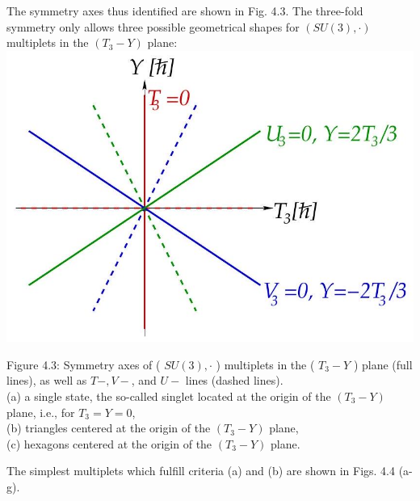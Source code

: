 \documentclass[10pt, letterpaper]{article}
\begin{document}
The symmetry axes thus identified are shown in Fig. 4.3. The three-fold symmetry only allows three possible geometrical shapes for $(S U(3), \cdot)$ multiplets in the $\left(T_{3}-Y\right)$ plane:\\
\includegraphics[scale=0.3, center]{2025_05_20_8618f55a41bfe980b4b2g-48}

Figure 4.3: Symmetry axes of ( $S U(3), \cdot$ ) multiplets in the ( $T_{3}-Y$ ) plane (full lines), as well as $T-, V-$, and $U-$ lines (dashed lines).\\
(a) a single state, the so-called singlet located at the origin of the $\left(T_{3}-Y\right)$ plane, i.e., for $T_{3}=Y=0$,\\
(b) triangles centered at the origin of the $\left(T_{3}-Y\right)$ plane,\\
(c) hexagons centered at the origin of the $\left(T_{3}-Y\right)$ plane.

The simplest multiplets which fulfill criteria (a) and (b) are shown in Figs. 4.4 (a-g).
\end{document}
